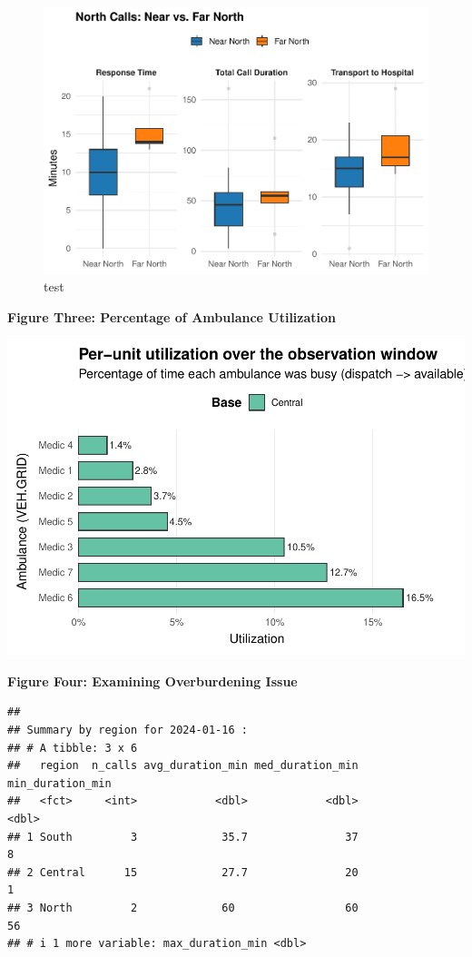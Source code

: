 \documentclass[
]{article}
\begin{document}
\begin{figure}
\centering
\includegraphics{Report_files/figure-latex/eda2_2-1.pdf}
\caption{test}
\end{figure}

\textbf{Figure Three: Percentage of Ambulance Utilization}

\includegraphics{Report_files/figure-latex/eda3-1.pdf}

\textbf{Figure Four: Examining Overburdening Issue}

\begin{verbatim}
## 
## Summary by region for 2024-01-16 :
## # A tibble: 3 x 6
##   region  n_calls avg_duration_min med_duration_min min_duration_min
##   <fct>     <int>            <dbl>            <dbl>            <dbl>
## 1 South         3             35.7               37                8
## 2 Central      15             27.7               20                1
## 3 North         2             60                 60               56
## # i 1 more variable: max_duration_min <dbl>
\end{verbatim}
\end{document}
